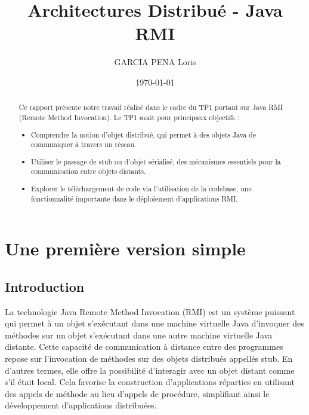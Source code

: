 \documentclass{article} %
\title{Architectures Distribué - Java RMI}
\author{GARCIA PENA Loris}
\date{\today} %
\begin{document}

\maketitle %

\begin{abstract}
    Ce rapport présente notre travail réalisé dans le cadre du TP1 portant sur Java RMI (Remote Method Invocation). Le TP1 avait pour principaux objectifs :

    \begin{itemize}
        \item Comprendre la notion d'objet distribué, qui permet à des objets Java de communiquer à travers un réseau.
        \item Utiliser le passage de stub ou d'objet sérialisé, des mécanismes essentiels pour la communication entre objets distants.
        \item Explorer le téléchargement de code via l'utilisation de la codebase, une fonctionnalité importante dans le déploiement d'applications RMI.
    \end{itemize}
\end{abstract}

\tableofcontents %

\newpage %

\section{Une première version simple}

\subsection{Introduction}

La technologie Java Remote Method Invocation (RMI) est un système puissant qui permet à un objet s'exécutant dans une machine virtuelle 
Java d'invoquer des méthodes sur un objet s'exécutant dans une autre machine virtuelle Java distante. Cette capacité de communication à distance 
entre des programmes repose sur l'invocation de méthodes sur des objets distribués appellés stub. 
En d'autres termes, elle offre la possibilité d'interagir avec un objet distant comme s'il était local. 
Cela favorise la construction d'applications réparties en utilisant des appels de méthode au lieu d'appels de procédure, 
simplifiant ainsi le développement d'applications distribuées.
\end{document}
